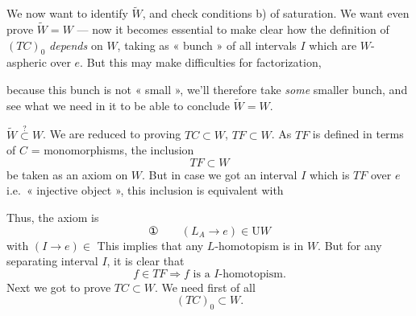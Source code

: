 \documentclass[11pt,a4paper]{article}
\begin{document}
We now want to identify $\widetilde{W}$, and check conditions b) of
saturation. We want even prove $\widetilde{W} = W$ — now it becomes
essential to \struck{\ill{}} make clear how the definition of $(TC)_0$
\emph{depends} on $W$, taking as « bunch » of  all
intervals $I$ which are $W$-aspheric over $e$. But this may make
difficulties for factorization,

because this bunch is not « small », we'll therefore take \emph{some}
smaller bunch, and see what we need in it to be able to conclude
$\widetilde{W} = W$.

$\widetilde{W} \overset{?}{\subset} W$. We are reduced to proving
$TC \subset W$, $TF \subset W$. As $TF$ is defined in terms of
$C$ = monomorphisms, the inclusion
\[
  \boxed{TF \subset W}
\]
 be taken as an axiom on $W$. But in case we got an
 interval $I$ which is $TF$ over $e$ i.e.\ « injective
object »,  this inclusion is equivalent with

Thus, the axiom is 
\[
  \text{①}\qquad \boxed{(L_A \to e) \in \mathrm{U}W}
\]
  with
$(I \to e) \in$ \ill{}
This implies that any $L$-homotopism is in $W$. But for  any
separating interval $I$, it is clear that
\[
  f \in TF \Longrightarrow f \text{ is a } I\text{-homotopism}.
\]
Next we got to prove $TC \subset W$. We need first of all
\[
  (TC)_0 \subset W .
\]
\struck{\ill{}}


\end{document}
